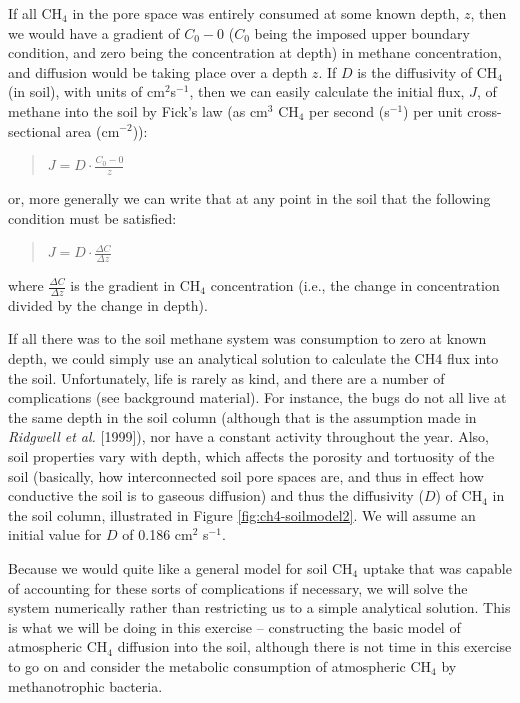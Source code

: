 \documentclass{tufte-book} %
\newenvironment{docspec}{\begin{quotation}\ttfamily\parskip0pt\parindent0pt\ignorespaces}{\end{quotation}}
\begin{document}
If all CH\(_{4}\) in the pore space was entirely consumed at some known depth, \(z\), then we would have a gradient of \(C_{0} - 0\) (\(C_{0}\) being the imposed upper boundary condition, and zero being the concentration at depth) in methane concentration, and diffusion would be taking place over a depth \(z\). If \(D\) is the diffusivity of CH\(_{4}\) (in soil), with units of cm\(^{2}\)s\(^{-1}\), then we can easily calculate the initial flux, \(J\), of methane into the soil by Fick's law (as cm\(^{3}\) CH\(_{4}\) per second (s\(^{-1}\)) per unit cross-sectional area (cm\(^{-2}\))):
\begin{docspec}
\(J = D\cdot\frac{C_{0}-0}{z}\)
\end{docspec}
or, more generally we can write that at any point in the soil that the following condition must be satisfied:
\begin{docspec}
\(J = D\cdot\frac{\Delta C}{\Delta z}\)
\end{docspec}
where \(\frac{\Delta C}{\Delta z}\) is the gradient in CH\(_{4}\) concentration (i.e., the change in concentration divided by the change in depth).

If all there was to the soil methane system was consumption to zero at known depth, we could simply use an analytical solution to calculate the CH4 flux into the soil. Unfortunately, life is rarely as kind, and there are a number of complications (see background material). For instance, the bugs do not all live at the same depth in the soil column (although that is the assumption made in \textit{Ridgwell et al.} [1999]), nor have a constant activity throughout the year. Also, soil properties vary with depth, which affects the porosity and tortuosity of the soil (basically, how interconnected soil pore spaces are, and thus in effect how conductive the soil is to gaseous diffusion) and thus the diffusivity (\(D\)) of CH\(_{4}\) in the soil column, illustrated in Figure \ref{fig:ch4-soilmodel2}. We will assume an initial value for \(D\) of 0.186 cm\(^{2}\) s\(^{-1}\).

Because we would quite like a general model for soil CH\(_{4}\) uptake that was capable of accounting for these sorts of complications if necessary, we will solve the system numerically rather than restricting us to a simple analytical solution. This is what we will be doing in this exercise -- constructing the basic model of atmospheric CH\(_{4}\) diffusion into the soil, although there is not time in this exercise to go on and consider the metabolic consumption of atmospheric CH\(_{4}\) by methanotrophic bacteria.
\end{document}
